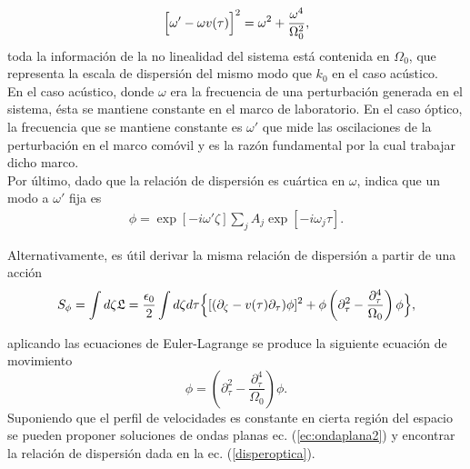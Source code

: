 \begin{equation}\label{disperoptica}
\Bigl[\omega'-\omega v(\tau)\Bigr]^2=\omega^2+\frac{\omega^4}{\Omega_0^2},
\end{equation}
toda la informaci\'{o}n de la no linealidad del sistema est\'{a} contenida en $\Omega_0$, que representa la escala de dispersi\'{o}n del mismo modo que $k_0$ en el caso ac\'{u}stico.\\

En el caso ac\'{u}stico, donde $\omega$ era la frecuencia de una perturbaci\'{o}n generada en el sistema, \'{e}sta se mantiene constante en el marco de laboratorio. En el caso \'{o}ptico, la frecuencia que se mantiene constante es $\omega'$ que mide las oscilaciones de la perturbaci\'{o}n en el marco com\'{o}vil y es la raz\'{o}n fundamental por la cual trabajar dicho marco.\\

Por \'{u}ltimo, dado que la relaci\'{o}n de dispersi\'{o}n es cu\'{a}rtica en $\omega$, indica que un modo a $\omega'$ fija es
\begin{align}\label{ec:ondaplana2}
\phi=\exp[-i\omega'\zeta]\sum_j A_j\exp[-i\omega_j \tau].
\end{align}

Alternativamente, es \'{u}til derivar la misma relaci\'{o}n de dispersi\'{o}n a partir de una acci\'{o}n
\begin{equation}\label{accion}
S_{\phi}=\int d\zeta \mathfrak{L}=\frac{\epsilon_0}{2}\int d\zeta d\tau \Bigl\{[(\partial_{\zeta}-v(\tau)\partial_{\tau})\phi]^2+\phi\left(\partial_{\tau}^2-\frac{\partial_{\tau}^4}{\Omega_0}\right)\phi\Bigr\},
\end{equation}

aplicando las ecuaciones de Euler-Lagrange se produce la siguiente ecuación de movimiento
\begin{equation}
[\partial_{\zeta}-\partial_{\tau}v(\tau)][\partial_{\zeta}-v(\tau)\partial_{\tau}]\phi=\left(\partial_{\tau}^2-\frac{\partial_{\tau}^4}{\Omega_0}\right)\phi.
\end{equation}
Suponiendo que el perfil de velocidades es constante en cierta regi\'{o}n del espacio se pueden proponer soluciones de ondas planas ec. (\ref{ec:ondaplana2}) y encontrar la relaci\'{o}n de dispersi\'{o}n dada en la ec. (\ref{disperoptica}).\\

